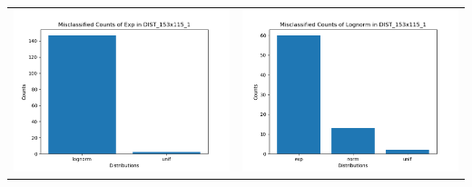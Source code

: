 \documentclass[12pt]{article}
\begin{document}
            \begin{table}

                
                
                \begin{center}
                    
                    \begin{tabular}{ c  c }

                        \includegraphics[scale=0.63]{mis-exp-count-in-dist.png} & \includegraphics[scale=0.63]{mis-lognorm-count-in-dist.png} \\
                

\end{tabular}
\end{center}
\end{table}
\end{document}
